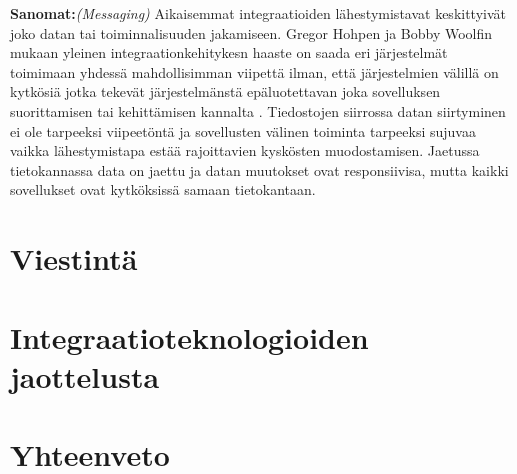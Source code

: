 \textbf{Sanomat:}\textit{(Messaging)} Aikaisemmat integraatioiden lähestymistavat keskittyivät joko datan tai toiminnalisuuden jakamiseen. Gregor Hohpen ja Bobby Woolfin mukaan yleinen integraationkehitykesn haaste on saada eri järjestelmät toimimaan yhdessä mahdollisimman viipettä ilman, että järjestelmien välillä on kytkösiä jotka tekevät järjestelmänstä epäluotettavan joka sovelluksen suorittamisen tai kehittämisen kannalta \citep[sivu~72]{Hohpe2004}. Tiedostojen siirrossa datan siirtyminen ei ole tarpeeksi viipeetöntä ja sovellusten välinen toiminta tarpeeksi sujuvaa vaikka lähestymistapa estää rajoittavien kyskösten muodostamisen. Jaetussa tietokannassa data on jaettu ja datan muutokset ovat responsiivisa, mutta kaikki sovellukset ovat kytköksissä samaan tietokantaan.








\chapter{Viestintä}

\chapter{Integraatioteknologioiden jaottelusta}

\chapter{Yhteenveto}

